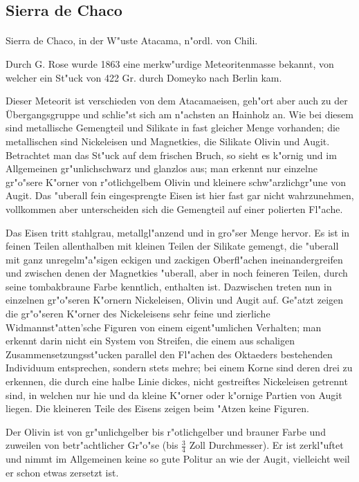 \documentclass[a4paper, 11pt, oneside]{article}
\begin{document}
\subsection{Sierra de Chaco}
\normalsize
\paragraph{}
Sierra de Chaco, in der W"uste Atacama, n"ordl. von Chili.

Durch G. Rose wurde 1863 eine merkw"urdige Meteoritenmasse bekannt, von welcher ein St"uck von 422 Gr. durch Domeyko nach Berlin kam.

Dieser Meteorit ist verschieden von dem Atacamaeisen, geh"ort aber auch zu der Übergangsgruppe und schlie"st sich am n"achsten an Hainholz an. Wie bei diesem sind metallische Gemengteil und Silikate in fast gleicher Menge vorhanden; die metallischen sind Nickeleisen und Magnetkies, die Silikate Olivin und Augit. Betrachtet man das St"uck auf dem frischen Bruch, so sieht es k"ornig und im Allgemeinen gr"unlichschwarz und glanzlos aus; man erkennt nur einzelne gr"o"sere K"orner von r"otlichgelbem Olivin und kleinere schw"arzlichgr"une von Augit. Das "uberall fein eingesprengte Eisen ist hier fast gar nicht wahrzunehmen, vollkommen aber unterscheiden sich die Gemengteil auf einer polierten Fl"ache.

Das Eisen tritt stahlgrau, metallgl"anzend und in gro"ser Menge hervor. Es ist in feinen Teilen allenthalben mit kleinen Teilen der Silikate gemengt, die "uberall mit ganz unregelm"a"sigen eckigen und zackigen Oberfl"achen ineinandergreifen und zwischen denen der Magnetkies "uberall, aber in noch feineren Teilen, durch seine tombakbraune Farbe kenntlich, enthalten ist. Dazwischen treten nun in einzelnen gr"o"seren K"ornern Nickeleisen, Olivin und Augit auf. Ge"atzt zeigen die gr"o"seren K"orner des Nickeleisens sehr feine und zierliche Widmannst"atten'sche Figuren von einem eigent"umlichen Verhalten; man erkennt darin nicht ein System von Streifen, die einem aus schaligen Zusammensetzungsst"ucken parallel den Fl"achen des Oktaeders bestehenden Individuum entsprechen, sondern stets mehre; bei einem Korne sind deren drei zu erkennen, die durch eine halbe Linie dickes, nicht gestreiftes Nickeleisen getrennt sind, in welchen nur hie und da kleine K"orner oder k"ornige Partien von Augit liegen. Die kleineren Teile des Eisens zeigen beim "Atzen keine Figuren.

Der Olivin ist von gr"unlichgelber bis r"otlichgelber und brauner Farbe und zuweilen von betr"achtlicher Gr"o"se (bis $\frac{3}{4}$ Zoll Durchmesser). Er ist zerkl"uftet und nimmt im Allgemeinen keine so gute Politur an wie der Augit, vielleicht weil er schon etwas zersetzt ist.
\end{document}
